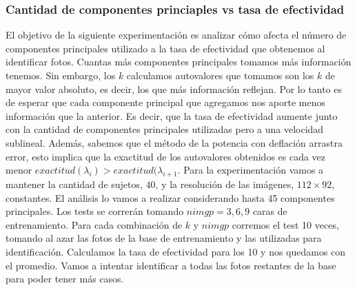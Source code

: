 \subsubsection{Cantidad de componentes princiaples vs tasa de efectividad}
El objetivo de la siguiente experimentación es analizar cómo afecta el número de componentes principales utilizado a la tasa de efectividad
que obtenemos al identificar fotos. Cuantas más componentes principales tomamos más información tenemos. Sin embargo, los $k$ calculamos
autovalores que tomamos son los $k$ de mayor valor absoluto, es decir, los que más información reflejan. Por lo tanto es de esperar que 
cada componente principal que agregamos nos aporte menos información que la anterior. Es decir, que la tasa de efectividad aumente junto con la 
cantidad de componentes principales utilizadas pero a una velocidad sublineal. Además, sabemos que el método de la potencia con deflación arrastra 
error, esto implica que la exactitud de los autovalores obtenidos es cada vez menor $exactitud(\lambda_i) > exactitud(\lambda_{i+1}$.
Para la experimentación vamos a mantener la cantidad de sujetos, $40$, y la resolución de las imágenes, $112 \times 92$, constantes. 
El análisis lo vamos a realizar considerando hasta 45 componentes principales. Los tests se correrán tomando $nimgp = 3, 6, 9$ caras de 
entrenamiento. Para cada combinación de $k$ y $nimgp$ corremos el test 10 veces, tomando al azar las fotos de la base de entrenamiento y las 
utilizadas para identificación. Calculamos la tasa de efectividad para los 10 y nos quedamos con el promedio. Vamos a intentar identificar
a todas las fotos restantes de la base para poder tener más casos.